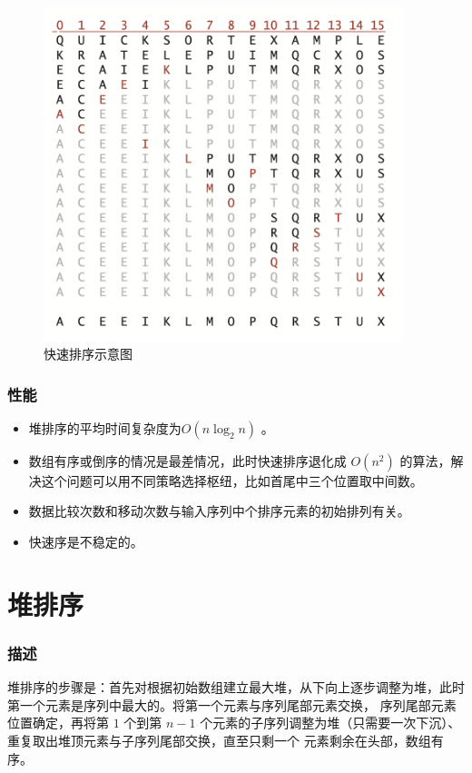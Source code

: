 \begin{figure}[H]
    \centering
    \includegraphics[width=10.5cm]{src/quick.png}
    \caption{快速排序示意图}
\end{figure}

\subsubsection{性能}
\begin{itemize}
    \item 堆排序的平均时间复杂度为$O(n\log_2{n})$ 。
    \item 数组有序或倒序的情况是最差情况，此时快速排序退化成 $O(n^2)$ 的算法，解决这个问题可以用不同策略选择枢纽，比如首尾中三个位置取中间数。
    \item 数据比较次数和移动次数与输入序列中个排序元素的初始排列有关。
    \item 快速序是不稳定的。
\end{itemize}

\section{堆排序}

\subsubsection{描述}
堆排序的步骤是：首先对根据初始数组建立最大堆，从下向上逐步调整为堆，此时第一个元素是序列中最大的。将第一个元素与序列尾部元素交换，%
序列尾部元素位置确定，再将第 $1$ 个到第 $n-1$ 个元素的子序列调整为堆（只需要一次下沉）、重复取出堆顶元素与子序列尾部交换，直至只剩一个%
元素剩余在头部，数组有序。


